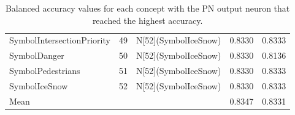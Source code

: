 \begin{table}[t]
\begin{tabular}{lllll}
SymbolIntersectionPriority & 49 & N[52](SymbolIceSnow) & 0.8330 & 0.8333 \\
SymbolDanger & 50 & N[52](SymbolIceSnow) & 0.8330 & 0.8136 \\
SymbolPedestrians & 51 & N[52](SymbolIceSnow) & 0.8330 & 0.8333 \\
SymbolIceSnow & 52 & N[52](SymbolIceSnow) & 0.8330 & 0.8333 \\
Mean &  &  & 0.8347 & 0.8331 \\
\bottomrule
\end{tabular}
\caption{Balanced accuracy values for each concept with the PN output neuron that reached the highest accuracy.}
\label{tab:onto_base_max_balanced_accuracy}
\end{table}
